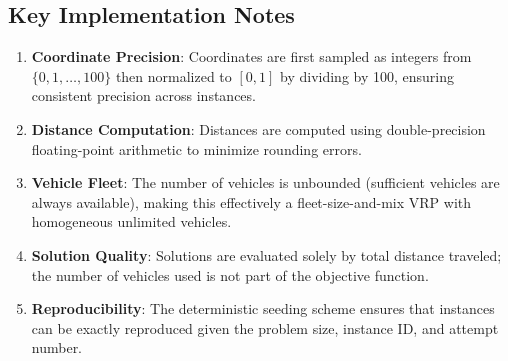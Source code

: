 \documentclass[11pt]{article}
\begin{document}
\subsection{Key Implementation Notes}

\begin{enumerate}
    \item \textbf{Coordinate Precision}: Coordinates are first sampled as integers from $\{0, 1, \ldots, 100\}$ then normalized to $[0, 1]$ by dividing by 100, ensuring consistent precision across instances.
    
    \item \textbf{Distance Computation}: Distances are computed using double-precision floating-point arithmetic to minimize rounding errors.
    
    \item \textbf{Vehicle Fleet}: The number of vehicles is unbounded (sufficient vehicles are always available), making this effectively a fleet-size-and-mix VRP with homogeneous unlimited vehicles.
    
    \item \textbf{Solution Quality}: Solutions are evaluated solely by total distance traveled; the number of vehicles used is not part of the objective function.
    
    \item \textbf{Reproducibility}: The deterministic seeding scheme ensures that instances can be exactly reproduced given the problem size, instance ID, and attempt number.
\end{enumerate}
\end{document}
